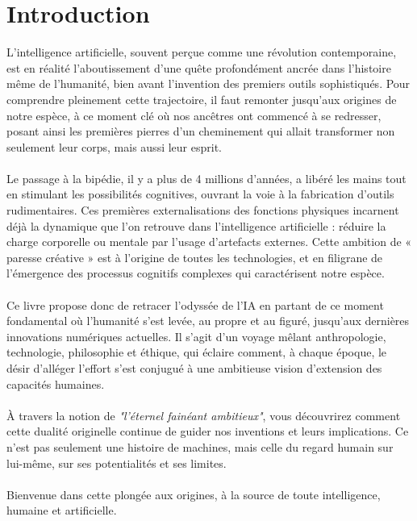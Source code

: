 \documentclass[12pt,a4paper]{book}
\begin{document}
\pagestyle{empty}
\tableofcontents

\newpage
\pagestyle{plain}
\chapter*{Introduction}

L'intelligence artificielle, souvent perçue comme une révolution contemporaine, est en réalité l'aboutissement d'une quête profondément ancrée dans l'histoire même de l'humanité, bien avant l'invention des premiers outils sophistiqués. Pour comprendre pleinement cette trajectoire, il faut remonter jusqu'aux origines de notre espèce, à ce moment clé où nos ancêtres ont commencé à se redresser, posant ainsi les premières pierres d'un cheminement qui allait transformer non seulement leur corps, mais aussi leur esprit.
\\ \\
Le passage à la bipédie, il y a plus de 4 millions d'années, a libéré les mains tout en stimulant les possibilités cognitives, ouvrant la voie à la fabrication d'outils rudimentaires. Ces premières externalisations des fonctions physiques incarnent déjà la dynamique que l'on retrouve dans l'intelligence artificielle : réduire la charge corporelle ou mentale par l'usage d'artefacts externes. Cette ambition de « paresse créative » est à l'origine de toutes les technologies, et en filigrane de l'émergence des processus cognitifs complexes qui caractérisent notre espèce.
\\ \\
Ce livre propose donc de retracer l'odyssée de l'IA en partant de ce moment fondamental où l'humanité s'est levée, au propre et au figuré, jusqu'aux dernières innovations numériques actuelles. Il s'agit d'un voyage mêlant anthropologie, technologie, philosophie et éthique, qui éclaire comment, à chaque époque, le désir d'alléger l'effort s'est conjugué à une ambitieuse vision d'extension des capacités humaines. 
\\ \\
À travers la notion de \textit{"l'éternel fainéant ambitieux"}, vous découvrirez comment cette dualité originelle continue de guider nos inventions et leurs implications. Ce n'est pas seulement une histoire de machines, mais celle du regard humain sur lui-même, sur ses potentialités et ses limites. 
\\ \\
Bienvenue dans cette plongée aux origines, à la source de toute intelligence, humaine et artificielle.
\end{document}
